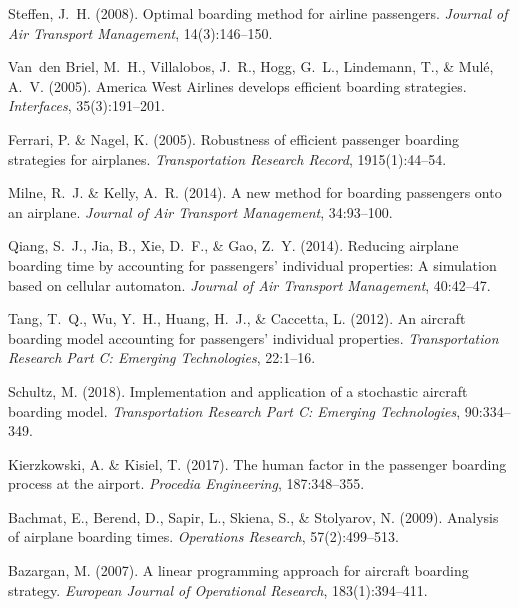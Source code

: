 \documentclass[a4paper,12pt]{article}
\begin{document}

\begin{thebibliography}{10}

Steffen, J.~H. (2008).
\newblock Optimal boarding method for airline passengers.
\newblock \emph{Journal of Air Transport Management}, 14(3):146--150.

Van~den Briel, M.~H., Villalobos, J.~R., Hogg, G.~L., Lindemann, T., \& Mul{\'e}, A.~V. (2005).
\newblock America West Airlines develops efficient boarding strategies.
\newblock \emph{Interfaces}, 35(3):191--201.

Ferrari, P. \& Nagel, K. (2005).
\newblock Robustness of efficient passenger boarding strategies for airplanes.
\newblock \emph{Transportation Research Record}, 1915(1):44--54.

Milne, R.~J. \& Kelly, A.~R. (2014).
\newblock A new method for boarding passengers onto an airplane.
\newblock \emph{Journal of Air Transport Management}, 34:93--100.

Qiang, S.~J., Jia, B., Xie, D.~F., \& Gao, Z.~Y. (2014).
\newblock Reducing airplane boarding time by accounting for passengers' individual properties: A simulation based on cellular automaton.
\newblock \emph{Journal of Air Transport Management}, 40:42--47.

Tang, T.~Q., Wu, Y.~H., Huang, H.~J., \& Caccetta, L. (2012).
\newblock An aircraft boarding model accounting for passengers' individual properties.
\newblock \emph{Transportation Research Part C: Emerging Technologies}, 22:1--16.

Schultz, M. (2018).
\newblock Implementation and application of a stochastic aircraft boarding model.
\newblock \emph{Transportation Research Part C: Emerging Technologies}, 90:334--349.

Kierzkowski, A. \& Kisiel, T. (2017).
\newblock The human factor in the passenger boarding process at the airport.
\newblock \emph{Procedia Engineering}, 187:348--355.

Bachmat, E., Berend, D., Sapir, L., Skiena, S., \& Stolyarov, N. (2009).
\newblock Analysis of airplane boarding times.
\newblock \emph{Operations Research}, 57(2):499--513.

Bazargan, M. (2007).
\newblock A linear programming approach for aircraft boarding strategy.
\newblock \emph{European Journal of Operational Research}, 183(1):394--411.

\end{thebibliography}
\end{document}

